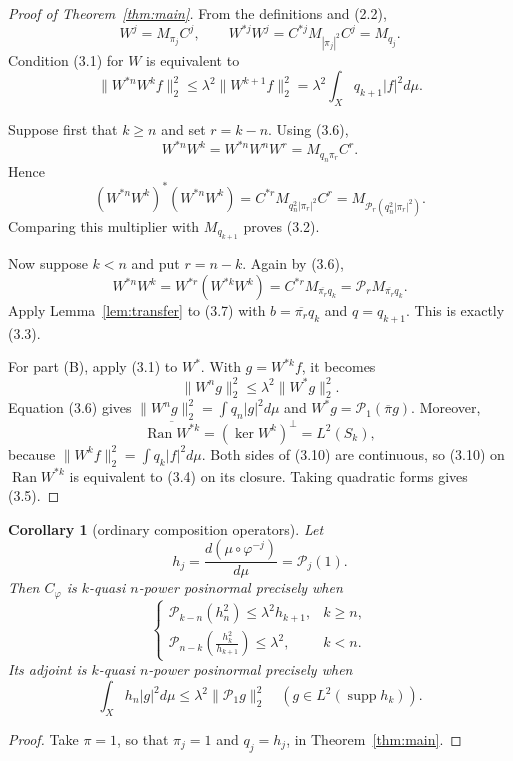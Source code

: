 \documentclass[11pt]{article}
\newtheorem{corollary}[theorem]{Corollary}
\newcommand{\Perr}{\mathcal P}
\newcommand{\1}{\mathbf 1}
\newcommand{\supp}{\operatorname{supp}}
\newcommand{\Ran}{\operatorname{Ran}}
\begin{document}
\begin{proof}[Proof of Theorem~\ref{thm:main}]
From the definitions and (2.2),
\[
 W^j=M_{\pi_j}C^j,
 \qquad
 W^{*j}W^j=C^{*j}M_{|\pi_j|^2}C^j=M_{q_j}. \tag{3.6}
\]
Condition (3.1) for $W$ is equivalent to
\[
 \|W^{*n}W^kf\|_2^2
 \le\lambda^2\|W^{k+1}f\|_2^2
 =\lambda^2\int_Xq_{k+1}|f|^2d\mu. \tag{3.7}
\]

Suppose first that $k\ge n$ and set $r=k-n$.  Using (3.6),
\[
 W^{*n}W^k
 =W^{*n}W^nW^r
 =M_{q_n\pi_r}C^r.
\]
Hence
\[
 (W^{*n}W^k)^*(W^{*n}W^k)
 =C^{*r}M_{q_n^2|\pi_r|^2}C^r
 =M_{\Perr_r(q_n^2|\pi_r|^2)}. \tag{3.8}
\]
Comparing this multiplier with $M_{q_{k+1}}$ proves (3.2).

Now suppose $k<n$ and put $r=n-k$.  Again by (3.6),
\[
 W^{*n}W^k
 =W^{*r}(W^{*k}W^k)
 =C^{*r}M_{\overline{\pi_r}q_k}
 =\Perr_rM_{\overline{\pi_r}q_k}. \tag{3.9}
\]
Apply Lemma~\ref{lem:transfer} to (3.7) with
$b=\overline{\pi_r}q_k$ and $q=q_{k+1}$.  This is exactly (3.3).

For part (B), apply (3.1) to $W^*$.  With $g=W^{*k}f$, it becomes
\[
 \|W^ng\|_2^2\le\lambda^2\|W^*g\|_2^2. \tag{3.10}
\]
Equation (3.6) gives $\|W^ng\|_2^2=\int q_n|g|^2d\mu$ and
$W^*g=\Perr_1(\overline\pi g)$.  Moreover,
\[
 \overline{\Ran W^{*k}}=(\ker W^k)^\perp=L^2(S_k), \tag{3.11}
\]
because $\|W^kf\|_2^2=\int q_k|f|^2d\mu$.  Both sides of (3.10) are
continuous, so (3.10) on $\Ran W^{*k}$ is equivalent to (3.4) on its closure.
Taking quadratic forms gives (3.5).
\end{proof}

\begin{corollary}[ordinary composition operators]\label{cor:composition}
Let
\[
 h_j=\frac{d(\mu\circ\varphi^{-j})}{d\mu}=\Perr_j(1).
\]
Then $C_\varphi$ is $k$-quasi $n$-power posinormal precisely when
\[
 \begin{cases}
 \Perr_{k-n}(h_n^2)\le\lambda^2h_{k+1},&k\ge n,\\[3pt]
 \displaystyle
 \Perr_{n-k}\!\left(\frac{h_k^2}{h_{k+1}}\right)\le\lambda^2,&k<n.
 \end{cases} \tag{3.12}
\]
Its adjoint is $k$-quasi $n$-power posinormal precisely when
\[
 \int_Xh_n|g|^2d\mu\le\lambda^2\|\Perr_1g\|_2^2
 \quad(g\in L^2(\supp h_k)). \tag{3.13}
\]
\end{corollary}

\begin{proof}
Take $\pi=1$, so that $\pi_j=1$ and $q_j=h_j$, in
Theorem~\ref{thm:main}.
\end{proof}
\end{document}
